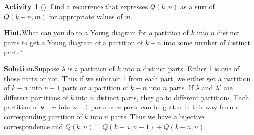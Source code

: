 \documentclass[10pt,]{book}
\theoremstyle{plain}
\theoremstyle{definition}
\newtheorem{activity}[project]{Activity}
\numberwithin{equation}{chapter}
\begin{document}
\begin{activity}[]\label{activity-163}
Find a recurrence that expresses \(Q(k,n)\) as a sum of \(Q(k-n,m)\) for appropriate values of \(m\).%
\par\medskip\noindent%
\textbf{Hint.}\quad What can you do to a Young diagram for a partition of \(k\) into \(n\) distinct parts to get a Young diagram of a partition of \(k-n\) into some number of distinct parts?%
\par\medskip\noindent%
\textbf{Solution.}\quad Suppose \(\lambda\) is a partition of \(k\) into \(n\) distinct parts. Either 1 is one of those parts or not. Thus if we subtract 1 from each part, we either get a partition of \(k-n\) into \(n-1\) parts or a partition of \(k-n\) into \(n\) parts. If \(\lambda\) and \(\lambda'\) are different partitions of \(k\) into \(n\) distinct parts, they go to different partitions. Each partition of \(k-n\) into \(n-1\) parts or \(n\) parts can be gotten in this way from a corresponding partition of \(k\) into \(n\) parts. Thus we have a bijective correspondence and \(Q(k,n)=Q(k-n,n-1) +Q(k-n,n)\).%
\end{activity}
\end{document}
